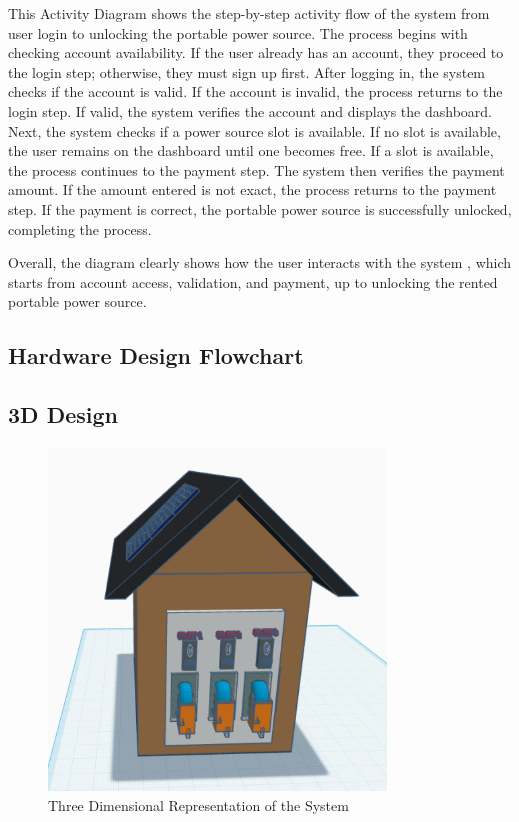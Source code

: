 { This Activity Diagram shows the step-by-step activity flow of the system from user login to unlocking the portable power source. The process begins with checking account availability. If the user already has an account, they proceed to the login step; otherwise, they must sign up first. After logging in, the system checks if the account is valid. If the account is invalid, the process returns to the login step. If valid, the system verifies the account and displays the dashboard. Next, the system checks if a power source slot is available. If no slot is available, the user remains on the dashboard until one becomes free. If a slot is available, the process continues to the payment step. The system then verifies the payment amount. If the amount entered is not exact, the process returns to the payment step. If the payment is correct, the portable power source is successfully unlocked, completing the process.
 
 Overall, the diagram clearly shows how the user interacts with the system , which starts from account access, validation, and payment, up to unlocking the rented portable power source.
 
  \subsection{Hardware Design Flowchart}
  
  
   
  \subsection{3D Design}
  
    \begin{figure}[H]
  	\centering
  	\caption{Three Dimensional Representation of the System}
  	\label{fig:3d}
  	\includegraphics[width=0.8\textwidth]{figures/3D.png}
  \end{figure}
  
}
